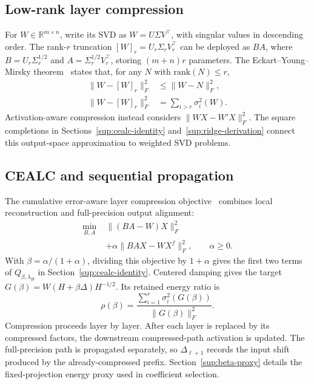 \subsection{Low-rank layer compression}
For $W\in\mathbb R^{m\times n}$, write its SVD as $W=U\Sigma V^\top$, with singular values in descending order. The rank-$r$ truncation $[W]_r=U_r\Sigma_rV_r^\top$ can be deployed as $BA$, where $B=U_r\Sigma_r^{1/2}$ and $A=\Sigma_r^{1/2}V_r^\top$, storing $(m+n)r$ parameters. The Eckart--Young--Mirsky theorem~\citep{eckart1936eym} states that, for any $N$ with $\mathrm{rank}(N)\le r$,
\begin{equation}
\begin{aligned}
\|W-[W]_r\|_F^2&\le\|W-N\|_F^2,\\
\|W-[W]_r\|_F^2&=\sum_{i>r}\sigma_i^2(W).
\end{aligned}
\label{eq:app-eym}
\end{equation}
Activation-aware compression instead considers $\|WX-W'X\|_F^2$. The square completions in Sections~\ref{sup:cealc-identity} and~\ref{sup:ridge-derivation} connect this output-space approximation to weighted SVD problems.

\subsection{CEALC and sequential propagation}
The cumulative error-aware layer compression objective~\citep{hu2026saessvd} combines local reconstruction and full-precision output alignment:
\begin{equation}
\begin{aligned}
\min_{B,A}\;&\|(BA-W)X\|_F^2\\
&+\alpha\|BAX-WX^f\|_F^2,
\qquad\alpha\ge0.
\end{aligned}
\label{eq:app-cealc}
\end{equation}
With $\beta=\alpha/(1+\alpha)$, dividing this objective by $1+\alpha$ gives the first two terms of $Q_{\beta,\lambda_H}$ in Section~\ref{sup:cealc-identity}. Centered damping gives the target $G(\beta)=W(H+\beta\Delta)H^{-1/2}$. Its retained energy ratio is
\begin{equation}
\rho(\beta)=
\frac{\sum_{i=1}^{r}\sigma_i^2(G(\beta))}{\|G(\beta)\|_F^2}.
\label{eq:app-cealc-rer}
\end{equation}
Compression proceeds layer by layer. After each layer is replaced by its compressed factors, the downstream compressed-path activation is updated. The full-precision path is propagated separately, so $\Delta_{\ell+1}$ records the input shift produced by the already-compressed prefix. Section~\ref{sup:beta-proxy} details the fixed-projection energy proxy used in coefficient selection.

